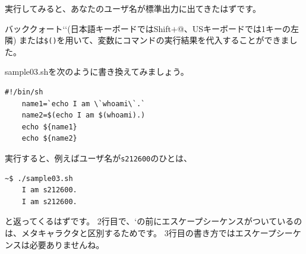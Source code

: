 \documentclass[a4j]{ltjsreport}
\begin{document}
    実行してみると、あなたのユーザ名が標準出力に出てきたはずです。

    バッククォート`\quad`(日本語キーボードではShift$+$@、USキーボードでは1キーの左隣)
    または\texttt{\$(\quad)}を用いて、変数にコマンドの実行結果を代入することができました。


    sample03.shを次のように書き換えてみましょう。
    \begin{lstlisting}[caption=sample03.sh 改]
    #!/bin/sh
    name1=`echo I am \`whoami\`.`
    name2=$(echo I am $(whoami).)
    echo ${name1}
    echo ${name2}
    \end{lstlisting}

    実行すると、例えばユーザ名が\texttt{s212600}のひとは、
    \begin{lstlisting}[numbers=none]
    ~$ ./sample03.sh
    I am s212600.
    I am s212600.
    \end{lstlisting}
    と返ってくるはずです。
    2行目で、`の前にエスケープシーケンスがついているのは、メタキャラクタと区別するためです。
    3行目の書き方ではエスケープシーケンスは必要ありませんね。
\end{document}
